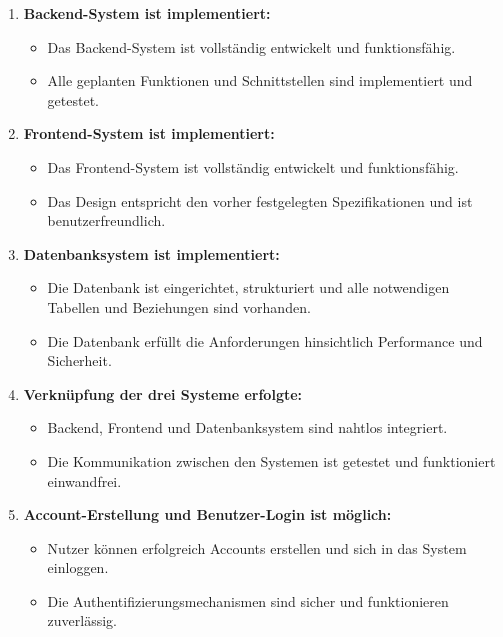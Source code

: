 \begin{enumerate}
\item \textbf{Backend-System ist implementiert:}
\begin{itemize}[label=--, itemsep=0pt, parsep=0pt]
\item Das Backend-System ist vollständig entwickelt und funktionsfähig.
\item Alle geplanten Funktionen und Schnittstellen sind implementiert und getestet.
\end{itemize}

\item \textbf{Frontend-System ist implementiert:}
\begin{itemize}[label=--, itemsep=0pt, parsep=0pt]
\item Das Frontend-System ist vollständig entwickelt und funktionsfähig.
\item Das Design entspricht den vorher festgelegten Spezifikationen und ist benutzerfreundlich.
\end{itemize}

\item \textbf{Datenbanksystem ist implementiert:}
\begin{itemize}[label=--, itemsep=0pt, parsep=0pt]
\item Die Datenbank ist eingerichtet, strukturiert und alle notwendigen Tabellen und Beziehungen sind vorhanden.
\item Die Datenbank erfüllt die Anforderungen hinsichtlich Performance und Sicherheit.
\end{itemize}

\item \textbf{Verknüpfung der drei Systeme erfolgte:}
\begin{itemize}[label=--, itemsep=0pt, parsep=0pt]
\item Backend, Frontend und Datenbanksystem sind nahtlos integriert.
\item Die Kommunikation zwischen den Systemen ist getestet und funktioniert einwandfrei.
\end{itemize}

\item \textbf{Account-Erstellung und Benutzer-Login ist möglich:}
\begin{itemize}[label=--, itemsep=0pt, parsep=0pt]
\item Nutzer können erfolgreich Accounts erstellen und sich in das System einloggen.
\item Die Authentifizierungsmechanismen sind sicher und funktionieren zuverlässig.
\end{itemize}


\end{enumerate}
